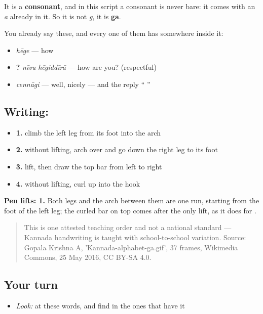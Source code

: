 It is a \textbf{consonant}, and in this script a consonant is never bare: it comes with an \emph{a} already in it. So it is not \emph{g}, it is \textbf{ga}.

You already say these, and every one of them has  somewhere inside it:

\begin{itemize}
\raggedright
  \item \textbf{} \emph{hēge} — how
  \item \textbf{ ?} \emph{nīvu hēgiddīrā} — how are you? (respectful)
  \item \textbf{} \emph{cennāgi} — well, nicely — and the reply \textquotedblleft{} \textquotedblright{}
\end{itemize}

\subsection*{Writing: }

\begin{itemize}
\raggedright
  \item \textbf{1.} climb the left leg from its foot into the arch
  \item \textbf{2.} without lifting, arch over and go down the right leg to its foot
  \item \textbf{3.} lift, then draw the top bar from left to right
  \item \textbf{4.} without lifting, curl up into the hook
\end{itemize}

\textbf{Pen lifts: 1.} Both legs and the arch between them are one run, starting from the foot of the left leg; the curled bar on top comes after the only lift, as it does for .

\begin{quote}
This is one attested teaching order and not a national standard — Kannada handwriting is taught with school-to-school variation. Source: Gopala Krishna A, 'Kannada-alphabet-ga.gif', 37 frames, Wikimedia Commons, 25 May 2016, CC BY-SA 4.0.
\end{quote}

\subsection*{Your turn}
\begin{itemize}
\raggedright
  \item \emph{Look:} at these words, and find  in the ones that have it
\end{itemize}

